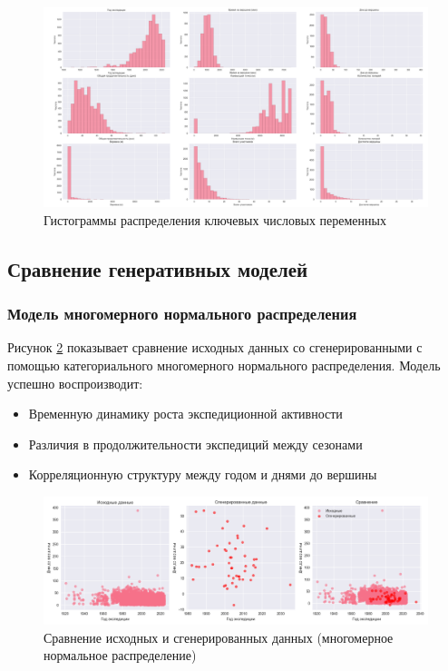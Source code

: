 \documentclass[12pt, a4paper]{article}
\begin{document}
\begin{figure}[H]
    \centering
    \includegraphics[width=1\textwidth]{Figure_2.png}
    \caption{Гистограммы распределения ключевых числовых переменных}
    \label{fig:histograms}
\end{figure}

\subsection{Сравнение генеративных моделей}
\subsubsection{Модель многомерного нормального распределения}
Рисунок \ref{fig:multivariate} показывает сравнение исходных данных со сгенерированными с помощью категориального многомерного нормального распределения. Модель успешно воспроизводит:
\begin{itemize}
    \item Временную динамику роста экспедиционной активности
    \item Различия в продолжительности экспедиций между сезонами
    \item Корреляционную структуру между годом и днями до вершины
\end{itemize}

\begin{figure}[H]
    \centering
    \includegraphics[width=1\textwidth]{Figure_3.png}
    \caption{Сравнение исходных и сгенерированных данных (многомерное нормальное распределение)}
    \label{fig:multivariate}
\end{figure}
\end{document}
